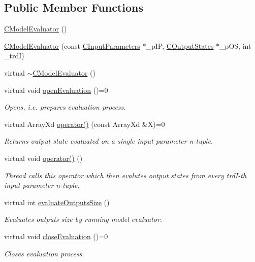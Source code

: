 \subsection*{Public Member Functions}
\begin{DoxyCompactItemize}
\item 
\hyperlink{class_go_s_u_m_1_1_c_model_evaluator_a3ba3293fe60b39397a0237b5f8cc78d1}{C\-Model\-Evaluator} ()
\item 
\hyperlink{class_go_s_u_m_1_1_c_model_evaluator_a1cc75e7c7ce09722eb767b1aa1fa1361}{C\-Model\-Evaluator} (const \hyperlink{class_go_s_u_m_1_1_c_input_parameters}{C\-Input\-Parameters} $\ast$\-\_\-p\-I\-P, \hyperlink{class_go_s_u_m_1_1_c_output_states}{C\-Output\-States} $\ast$\-\_\-p\-O\-S, int \-\_\-trd\-I)
\item 
virtual \hyperlink{class_go_s_u_m_1_1_c_model_evaluator_a36f48644d3ab77437fa77acb4418a326}{$\sim$\-C\-Model\-Evaluator} ()
\item 
virtual void \hyperlink{class_go_s_u_m_1_1_c_model_evaluator_a0f5afddb7ed75aad687d3a00e44012a0}{open\-Evaluation} ()=0
\begin{DoxyCompactList}\small\item\em Opens, i.\-e. prepares evaluation process. \end{DoxyCompactList}\item 
virtual Array\-Xd \hyperlink{class_go_s_u_m_1_1_c_model_evaluator_a17541eada67797802edcae14533361ad}{operator()} (const Array\-Xd \&X)=0
\begin{DoxyCompactList}\small\item\em Returns output state evaluated on a single input parameter n-\/tuple. \end{DoxyCompactList}\item 
virtual void \hyperlink{class_go_s_u_m_1_1_c_model_evaluator_a27d4b3c17958df42dd62b0d7d2e064d1}{operator()} ()
\begin{DoxyCompactList}\small\item\em Thread calls this operator which then evalutes output states from every trd\-I-\/th input parameter n-\/tuple. \end{DoxyCompactList}\item 
virtual int \hyperlink{class_go_s_u_m_1_1_c_model_evaluator_a822314faa443612c8840e6252018efb2}{evaluate\-Outputs\-Size} ()
\begin{DoxyCompactList}\small\item\em Evaluates outputs size by running model evaluator. \end{DoxyCompactList}\item 
virtual void \hyperlink{class_go_s_u_m_1_1_c_model_evaluator_a7ed9761e18560616881ebe459c6b8952}{close\-Evaluation} ()=0
\begin{DoxyCompactList}\small\item\em Closes evaluation process. \end{DoxyCompactList}\end{DoxyCompactItemize}
